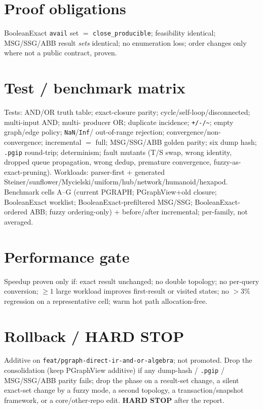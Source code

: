 \documentclass[11pt]{article}
\begin{document}
\section*{Proof obligations}
BooleanExact \texttt{avail} set $=$ \texttt{close\_producible}; feasibility identical; MSG/SSG/ABB result
\emph{sets} identical; no enumeration loss; order changes only where not a public contract, proven.

\section*{Test / benchmark matrix}
Tests: AND/OR truth table; exact-closure parity; cycle/self-loop/disconnected; multi-input AND; multi-
producer OR; duplicate incidence; \texttt{+/-/\~{}}; empty graph/edge policy; \texttt{NaN}/\texttt{Inf}/
out-of-range rejection; convergence/non-convergence; incremental $=$ full; MSG/SSG/ABB golden parity; six
dump hash; \texttt{.pgip} round-trip; determinism; fault mutants (T/S swap, wrong identity, dropped queue
propagation, wrong dedup, premature convergence, fuzzy-as-exact-pruning). Workloads: parser-first + generated
Steiner/sunflower/Mycielski/uniform/hub/network/humanoid/hexapod. Benchmark cells A--G (current PGRAPH;
PGraphView+old closure; BooleanExact worklist; BooleanExact-prefiltered MSG/SSG; BooleanExact-ordered ABB;
fuzzy ordering-only) + before/after incremental; per-family, not averaged.

\section*{Performance gate}
Speedup proven only if: exact result unchanged; no double topology; no per-query conversion; $\ge 1$ large
workload improves first-result or visited states; no $>3\%$ regression on a representative cell; warm hot
path allocation-free.

\section*{Rollback / HARD STOP}
Additive on \texttt{feat/pgraph-direct-ir-and-or-algebra}; not promoted. Drop the consolidation (keep
PGraphView additive) if any dump-hash / \texttt{.pgip} / MSG/SSG/ABB parity fails; drop the phase on a
result-set change, a silent exact-set change by a fuzzy mode, a second topology, a transaction/snapshot
framework, or a core/other-repo edit. \textbf{HARD STOP} after the report.
\end{document}
